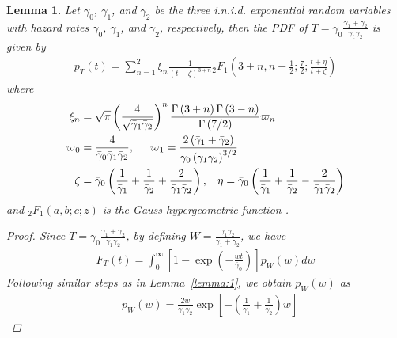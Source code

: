 \documentclass[conference]{IEEEtran}
\newtheorem{lemma}{Lemma}
\newcommand{\PDF}[2]{p_{{#1}}\left({#2}\right)}
\newcommand{\CDF}[2]{F_{{#1}}\left({#2}\right)}
\newcommand{\snri}[1]{\gamma_{#1}}
\newcommand{\snravei}[1]{\bar\gamma_{#1}}
\begin{document}
\begin{lemma} \label{lemma:2}
Let $\snri{0}$, $\snri{1}$, and $\snri{2}$ be the three i.n.i.d.
exponential random variables with hazard rates $\snravei{0}$,
$\snravei{1}$, and $\snravei{2}$, respectively, then the PDF of
$T=\snri{0}\frac{\snri{1}+\snri{2}}{\snri{1}\snri{2}}$ is given by
%
%
\begin{align} \label{eq:PDF:T:1}
    \PDF{T}{t}
    =
    \! \!
    \sum\limits_{n=1}^2
    \xi_n
    \tfrac{1}{(t+\zeta)^{3+n}}
    {_2}F_1\left(3+n,n+\tfrac{1}{2};\tfrac{7}{2};\tfrac{t+\eta}{t+\zeta}\right)
\end{align}
%
%
where
%
%
\begin{align*}
    \xi_n %
    &=
    \sqrt{\pi}
    \left(\frac{4}{\sqrt{\snravei{1}\snravei{2}}}\right)^{n}
    \frac{\Gamma\left(3+n\right)\Gamma\left(3-n\right)}{\Gamma\left(7/2\right)}
    \varpi_n
    \nonumber
    \\
    \varpi_0 %
    &=
    \frac{4}{\snravei{0}\snravei{1}\snravei{2}},
    \hspace{0.5cm}
    \varpi_1
    =
    \frac{2\left(\snravei{1}+\snravei{2}\right)}{\snravei{0}\left(\snravei{1}\snravei{2}\right)^{3/2}}
    \nonumber
    \\
    \zeta %
    &=
    \snravei{0} \left(\frac{1}{\snravei{1}} + \frac{1}{\snravei{2}} +
    \frac{2}{\snravei{1}\snravei{2}}\right),
    \hspace{0.3cm}
    \eta %
    =
    \snravei{0} \left(\frac{1}{\snravei{1}} + \frac{1}{\snravei{2}} - \frac{2}{\snravei{1}\snravei{2}}\right)
\end{align*}
%
%
and $_2F_1\left(a,b;c;z\right)$ is the Gauss hypergeometric function
\cite[eq.~(2.12.1)]{Erd:53:Book}.
%
\begin{proof} Since $T=\snri{0}\frac{\snri{1}+\snri{2}}{\snri{1}\snri{2}}$, by defining $W=\frac{\snri{1}\snri{2}}{\snri{1}+\snri{2}}$, we have
%
%
\begin{align} \label{eq:CDF:T:1}
    \CDF{T}{t}
    =
    \int\nolimits_{0}^{\infty}
    \left[1-\exp\left(-\frac{wt}{\snravei{0}}\right)\right]
    \PDF{W}{w} dw
\end{align}
%
%
Following similar steps as in Lemma~\ref{lemma:1}, we obtain
$\PDF{W}{w}$ as
%
%
\begin{align} \label{eq:PDF:W:1}
    &\PDF{W}{w}
    =
    \frac{2w}{\snravei{1}\snravei{2}}
    \exp\left[-\left(\frac{1}{\snravei{1}}+\frac{1}{\snravei{2}}\right)w\right]

\end{align}
\end{proof}
\end{lemma}
\end{document}
